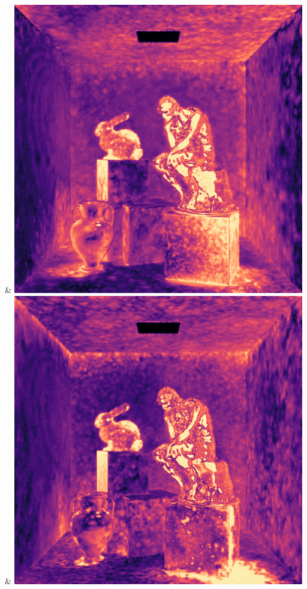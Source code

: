 & \includegraphics[width=\linewidth]{figures/py/tests/batch_size/100+nrc+pt+14_1spp_flip.png}
& \includegraphics[width=\linewidth]{figures/py/tests/batch_size/500+nrc+pt+14_1spp_flip.png}
